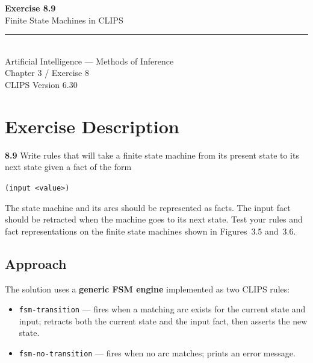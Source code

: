 \documentclass[12pt,a4paper]{article}
\begin{document}
\begin{titlepage}
  \centering
  \vspace*{3cm}
  {\Huge\bfseries\color{sectionblue} Exercise 8.9}\\[0.5em]
  {\Large Finite State Machines in CLIPS}\\[2em]
  \rule{0.6\linewidth}{1pt}\\[2em]
  {\large Artificial Intelligence --- Methods of Inference}\\[0.5em]
  {\large Chapter 3 / Exercise 8}\\[3em]
  \vfill
  {\normalsize CLIPS Version 6.30}
\end{titlepage}

\section{Exercise Description}

\begin{mdframed}[backgroundcolor=lightgray, linecolor=bordergray, linewidth=1pt,
    innerleftmargin=12pt, innerrightmargin=12pt,
    innertopmargin=10pt, innerbottommargin=10pt]
\textbf{8.9} \quad Write rules that will take a finite state machine from its present
state to its next state given a fact of the form

\vspace{0.5em}
\texttt{(input \textless value\textgreater)}

\vspace{0.5em}
The state machine and its arcs should be represented as facts. The input fact
should be retracted when the machine goes to its next state. Test your rules
and fact representations on the finite state machines shown in Figures~3.5
and~3.6.
\end{mdframed}

\subsection*{Approach}

The solution uses a \textbf{generic FSM engine} implemented as two CLIPS rules:

\begin{itemize}
  \item \texttt{fsm-transition} --- fires when a matching arc exists for the current
        state and input; retracts both the current state and the input fact, then
        asserts the new state.
  \item \texttt{fsm-no-transition} --- fires when no arc matches; prints an error
        message.
\end{itemize}
\end{document}
